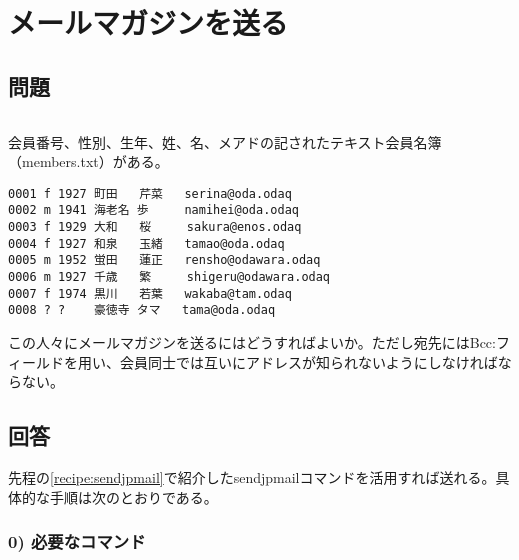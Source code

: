\section{メールマガジンを送る}
\label{recipe:mailmagazine}


\subsection*{問題}
\noindent
$\!\!\!\!\!$
\begin{grshfboxit}{160.0mm}
	会員番号、性別、生年、姓、名、メアドの記されたテキスト会員名簿（members.txt）がある。\\
\begin{frameboxit}{150.0mm}
	\verb|0001 f 1927 町田   芹菜   serina@oda.odaq      | \\
	\verb|0002 m 1941 海老名 歩     namihei@oda.odaq     | \\
	\verb|0003 f 1929 大和   桜     sakura@enos.odaq     | \\
	\verb|0004 f 1927 和泉   玉緒   tamao@oda.odaq       | \\
	\verb|0005 m 1952 蛍田   蓮正   rensho@odawara.odaq  | \\
	\verb|0006 m 1927 千歳   繁     shigeru@odawara.odaq | \\
	\verb|0007 f 1974 黒川   若葉   wakaba@tam.odaq      | \\
	\verb|0008 ? ?    豪徳寺 タマ   tama@oda.odaq        |
\end{frameboxit}

この人々にメールマガジンを送るにはどうすればよいか。ただし宛先にはBcc:フィールドを用い、会員同士では互いにアドレスが知られないようにしなければならない。
\end{grshfboxit}


\subsection*{回答}
先程の\ref{recipe:sendjpmail}で紹介したsendjpmailコマンドを活用すれば送れる。具体的な手順は次のとおりである。

\subsubsection*{0) 必要なコマンド}

